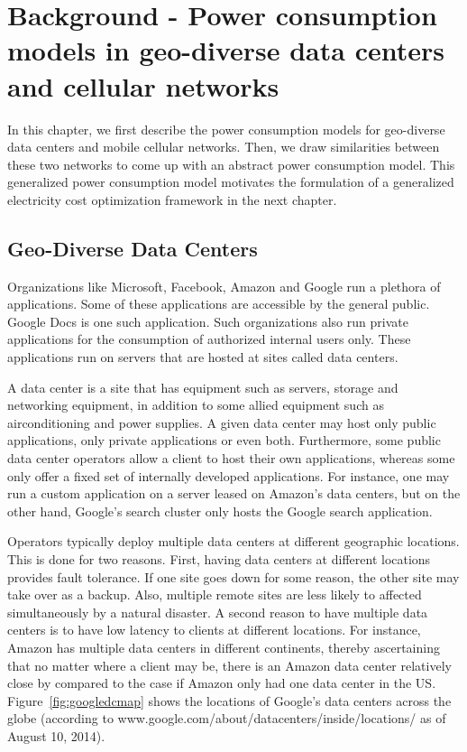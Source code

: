 \chapter{Background - Power consumption models in geo-diverse data centers and cellular networks}
\label{chap:background}
In this chapter, we first describe the power consumption models for geo-diverse data centers and mobile cellular networks. Then, we draw similarities between these two networks to come up with an abstract power consumption model. This generalized power consumption model motivates the formulation of a generalized electricity cost optimization framework in the next chapter. 

\section{Geo-Diverse Data Centers} Organizations like Microsoft, Facebook, Amazon and Google run a plethora of applications. Some of these applications are accessible by the general public. Google Docs is one such application. Such organizations also run private applications for the consumption of authorized internal users only. These applications run on servers that are hosted at sites called data centers.

A data center is a site that has equipment such as servers, storage and networking equipment, in addition to some allied equipment such as airconditioning and power supplies. A given data center may host only public applications, only private applications or even both. Furthermore, some public data center operators allow a client to host their own applications, whereas some only offer a fixed set of internally developed applications. For instance, one may run a custom application on a server leased on Amazon's data centers, but on the other hand, Google's search cluster only hosts the Google search application. 

Operators typically deploy multiple data centers at different geographic locations. This is done for two reasons. First, having data centers at different locations provides fault tolerance. If one site goes down for some reason, the other site may take over as a backup. Also, multiple remote sites are less likely to affected simultaneously by a natural disaster. A second reason to have multiple data centers is to have low latency to clients at different locations. For instance, Amazon has multiple data centers in different continents, thereby ascertaining that no matter where a client may be, there is an Amazon data center relatively close by compared to the case if Amazon only had one data center in the US. Figure~\ref{fig:googledcmap} shows the locations of Google's data centers across the globe (according to www.google.com/about/datacenters/inside/locations/ as of August 10, 2014).

